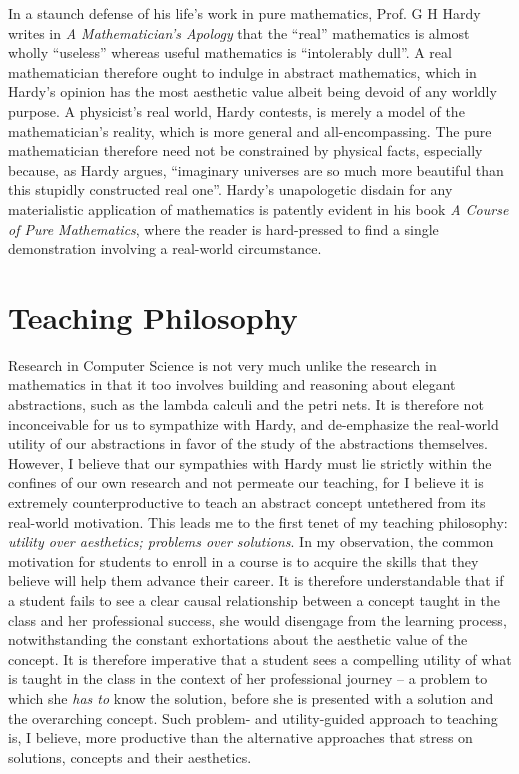 In a staunch defense of his life's work in pure mathematics, Prof. G H
Hardy writes in \emph{A Mathematician's Apology} that the ``real''
mathematics is almost wholly ``useless'' whereas useful mathematics is
``intolerably dull''.  A real mathematician therefore ought to indulge
in abstract mathematics, which in Hardy's opinion has the most
aesthetic value albeit being devoid of any worldly purpose. A
physicist's real world, Hardy contests, is merely a model of the
mathematician's reality, which is more general and all-encompassing.
The pure mathematician therefore need not be constrained by physical
facts, especially because, as Hardy argues, ``imaginary universes are
so much more beautiful than this stupidly constructed real one''.
Hardy's unapologetic disdain for any materialistic application of
mathematics is patently evident in his book \emph{A Course of Pure
Mathematics}, where the reader is hard-pressed to find a single
demonstration involving a real-world circumstance.

\section*{Teaching Philosophy}

Research in Computer Science is not very much unlike the research in
mathematics in that it too involves building and reasoning about
elegant abstractions, such as the lambda calculi and the petri nets.
It is therefore not inconceivable for us to sympathize with Hardy, and
de-emphasize the real-world utility of our abstractions in favor of
the study of the abstractions themselves. However, I believe that our
sympathies with Hardy must lie strictly within the confines of our own
research and not permeate our teaching, for I believe it is extremely
counterproductive to teach an abstract concept untethered from its
real-world motivation. This leads me to the first tenet of my teaching
philosophy: \emph{utility over aesthetics; problems over solutions}.
In my observation, the common motivation for students to enroll in a
course is to acquire the skills that they believe will help them
advance their career. It is therefore understandable that if a student
fails to see a clear causal relationship between a concept taught
in the class and her professional success, she would disengage from
the learning process, notwithstanding the constant exhortations about
the aesthetic value of the concept. It is therefore imperative that a
student sees a compelling utility of what is taught in the class in
the context of her professional journey -- a problem to which she
\emph{has to} know the solution, before she is presented with a
solution and the overarching concept. Such problem- and utility-guided
approach to teaching is, I believe, more productive than the
alternative approaches that stress on solutions, concepts and their
aesthetics.

